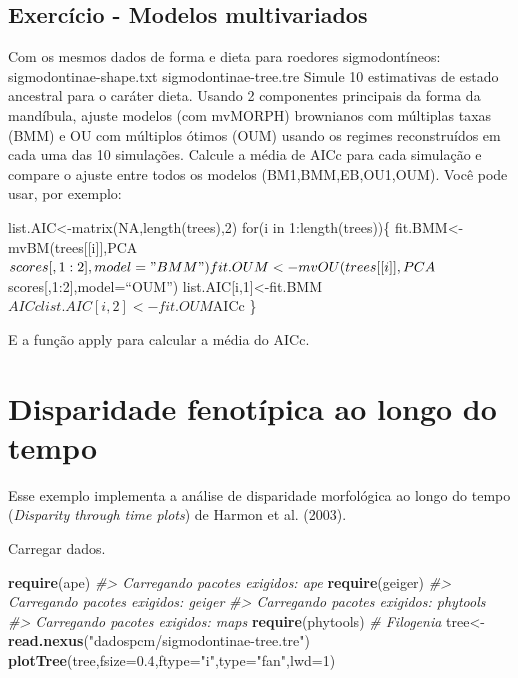 \documentclass[
]{book}
\newenvironment{Shaded}{\begin{snugshade}}{\end{snugshade}}
\newcommand{\AttributeTok}[1]{\textcolor[rgb]{0.13,0.29,0.53}{#1}}
\newcommand{\CommentTok}[1]{\textcolor[rgb]{0.56,0.35,0.01}{\textit{#1}}}
\newcommand{\DecValTok}[1]{\textcolor[rgb]{0.00,0.00,0.81}{#1}}
\newcommand{\FloatTok}[1]{\textcolor[rgb]{0.00,0.00,0.81}{#1}}
\newcommand{\FunctionTok}[1]{\textcolor[rgb]{0.13,0.29,0.53}{\textbf{#1}}}
\newcommand{\NormalTok}[1]{#1}
\newcommand{\OtherTok}[1]{\textcolor[rgb]{0.56,0.35,0.01}{#1}}
\newcommand{\StringTok}[1]{\textcolor[rgb]{0.31,0.60,0.02}{#1}}
\begin{document}
\section{Exercício - Modelos multivariados}\label{exercuxedcio---modelos-multivariados}

Com os mesmos dados de forma e dieta para roedores sigmodontíneos:
sigmodontinae-shape.txt
sigmodontinae-tree.tre
Simule 10 estimativas de estado ancestral para o caráter dieta. Usando 2 componentes principais da forma da mandíbula, ajuste modelos (com mvMORPH) brownianos com múltiplas taxas (BMM) e OU com múltiplos ótimos (OUM) usando os regimes reconstruídos em cada uma das 10 simulações. Calcule a média de AICc para cada simulação e compare o ajuste entre todos os modelos (BM1,BMM,EB,OU1,OUM).
Você pode usar, por exemplo:

list.AIC\textless-matrix(NA,length(trees),2)
for(i in 1:length(trees))\{
fit.BMM\textless-mvBM(trees{[}{[}i{]}{]},PCA\(scores[,1:2],model="BMM")
fit.OUM<-mvOU(trees[[i]],PCA\)scores{[},1:2{]},model=``OUM'')
list.AIC{[}i,1{]}\textless-fit.BMM\(AICc
list.AIC[i,2]<-fit.OUM\)AICc
\}

E a função apply para calcular a média do AICc.

\chapter{Disparidade fenotípica ao longo do tempo}\label{disparidade-fenotuxedpica-ao-longo-do-tempo}

Esse exemplo implementa a análise de disparidade morfológica ao longo do tempo (\emph{Disparity through time plots}) de Harmon et al. (2003).

Carregar dados.

\begin{Shaded}
\begin{Highlighting}[]
\FunctionTok{require}\NormalTok{(ape)}
\CommentTok{\#\textgreater{} Carregando pacotes exigidos: ape}
\FunctionTok{require}\NormalTok{(geiger)}
\CommentTok{\#\textgreater{} Carregando pacotes exigidos: geiger}
\CommentTok{\#\textgreater{} Carregando pacotes exigidos: phytools}
\CommentTok{\#\textgreater{} Carregando pacotes exigidos: maps}
\FunctionTok{require}\NormalTok{(phytools)}
\CommentTok{\# Filogenia}
\NormalTok{tree}\OtherTok{\textless{}{-}}\FunctionTok{read.nexus}\NormalTok{(}\StringTok{"dadospcm/sigmodontinae{-}tree.tre"}\NormalTok{)}
\FunctionTok{plotTree}\NormalTok{(tree,}\AttributeTok{fsize=}\FloatTok{0.4}\NormalTok{,}\AttributeTok{ftype=}\StringTok{"i"}\NormalTok{,}\AttributeTok{type=}\StringTok{"fan"}\NormalTok{,}\AttributeTok{lwd=}\DecValTok{1}\NormalTok{)}
\end{Highlighting}
\end{Shaded}
\end{document}
